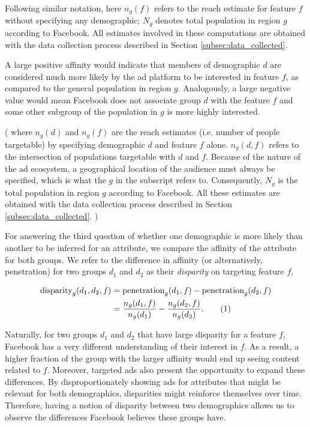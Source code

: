 Following similar notation, here $n_g(f)$ refers to the reach estimate for feature $f$ without specifying any demographic; $N_g$ denotes total population in region $g$ according to Facebook. All estimates involved in these computations are obtained with the data collection process described in Section \ref{subsec:data_collected}.

A large positive affinity would indicate that members of demographic $d$ are considered much more likely by the ad platform to be interested in feature $f$, as compared to the general population in region $g$. Analogously, a large negative value would mean Facebook does not associate group $d$ with the feature $f$ and some other subgroup of the population in $g$ is more highly interested.

\if(
where $n_g(d)$ and $n_g(f)$ are the reach estimates (i.e. number of people targetable) by specifying demographic $d$ and feature $f$ alone. $n_g(d, f)$ refers to the intersection of populations targetable with $d$ and $f$. Because of the nature of the ad ecosystem, a geographical location of the audience must always be specified, which is what the $g$ in the subscript refers to. Consequently, $N_g$ is the total population in region $g$ according to Facebook. All these estimates are obtained with the data collection process described in Section \ref{subsec:data_collected}.
)\fi

For answering the third question of whether one demographic is more likely than another to be inferred for an attribute, we compare the affinity of the attribute for both groups. We refer to the difference in affinity (or alternatively, penetration) for two groups $d_1$ and $d_2$ as their \textit{disparity} on targeting feature $f$,

\begin{align*}
\text{disparity}_g(d_1, d_2, f) &= \text{penetration}_g(d_1, f) - \text{penetration}_g(d_2, f)\\
&= \frac{n_g(d_1, f)}{n_g(d_1)} - \frac{n_g(d_2, f)}{n_g(d_2)}. \addtocounter{equation}{1}\tag{\theequation}
\label{eq:disparity}
\end{align*}

Naturally, for two groups $d_1$ and $d_2$ that have large disparity for a feature $f$, Facebook has a very different understanding of their interest in $f$. As a result, a higher fraction of the group with the larger affinity would end up seeing content related to $f$. Moreover, targeted ads also present the opportunity to expand these differences. By disproportionately showing ads for attributes that might be relevant for both demographics, disparities might reinforce themselves over time. Therefore, having a notion of disparity between two demographics allows us to observe the differences Facebook believes these groups have.

